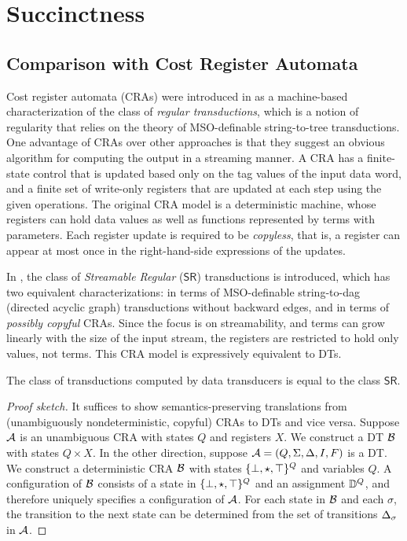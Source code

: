 \section{Succinctness}
\label{dt:sec:succinctness}

\subsection{Comparison with Cost Register Automata}
\label{dt:subsec:dts-and-cras}

Cost register automata (CRAs) were introduced in \cite{AdADRY2013CRA} as a machine-based characterization of the class of \emph{regular transductions}, which is a notion of regularity that relies on the theory of MSO-definable string-to-tree transductions. One advantage of CRAs over other approaches is that they suggest an obvious algorithm for computing the output in a streaming manner. A CRA has a finite-state control that is updated based only on the tag values of the input data word, and a finite set of write-only registers that are updated at each step using the given operations. The original CRA model is a deterministic machine, whose registers can hold data values as well as functions represented by terms with parameters. Each register update is required to be \emph{copyless}, that is, a register can appear at most once
in the right-hand-side expressions of the updates.

In , the class of \emph{Streamable Regular} ($\mathsf{SR}$) transductions is introduced, which has two equivalent characterizations: in terms of MSO-definable string-to-dag (directed acyclic graph) transductions without backward edges, and in terms of \emph{possibly copyful} CRAs. Since the focus is on streamability, and terms can grow linearly with the size of the input stream, the registers are restricted to hold only values, not terms. This CRA model is expressively equivalent to DTs.

\begin{theorem}
\label{dt:thm:dt-expressiveness}
The class of transductions computed by data transducers is equal to the class $\mathsf{SR}$.
\end{theorem}
\begin{proof}[Proof sketch]
It suffices to show semantics-preserving translations from (unambiguously nondeterministic, copyful) CRAs to DTs and vice versa. Suppose $\mathcal{A}$ is an unambiguous CRA with states $Q$ and registers $X$. We construct a DT $\mathcal{B}$ with states $Q \times X$. In the other direction, suppose $\mathcal{A} = (Q, \Sigma, \Delta, I, F)$ is a DT. We construct a deterministic CRA $\mathcal{B}$ with states $\{\bot,\star,\top\}^Q$ and variables $Q$. A configuration of $\mathcal{B}$ consists of a state in $\{\bot,\star,\top\}^Q$ and an assignment $\mathbb{D}^Q$, and therefore uniquely specifies a configuration of $\mathcal{A}$. For each state in $\mathcal{B}$ and each $\sigma$, the transition to the next state can be determined from the set of transitions $\Delta_\sigma$ in $\mathcal{A}$.
\end{proof}

